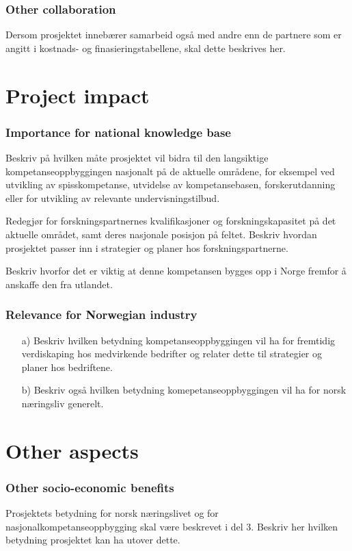 \documentclass[11pt,a4paper,norsk]{article}
\begin{document}
\section{Other collaboration}
Dersom prosjektet innebærer samarbeid også med andre enn de partnere som er angitt i kostnads- og finasieringstabellene, skal dette beskrives her.

\part{Project impact}

\section{Importance for national knowledge base}
Beskriv på hvilken måte prosjektet vil bidra til den langsiktige kompetanseoppbyggingen nasjonalt på de aktuelle områdene, for eksempel ved utvikling av spisskompetanse, utvidelse av kompetansebasen, forskerutdanning eller for utvikling av relevante undervisningstilbud.

Redegjør for forskningspartnernes kvalifikasjoner og forskningskapasitet på det aktuelle området, samt deres nasjonale posisjon på feltet. Beskriv hvordan prosjektet passer inn i strategier og planer hos forskningspartnerne.

Beskriv hvorfor det er viktig at denne kompetansen bygges opp i Norge fremfor å anskaffe den fra utlandet.

\section{Relevance for Norwegian industry}
\begin{itemize}
	\item[a)] Beskriv hvilken betydning kompetanseoppbyggingen vil ha for fremtidig verdiskaping hos medvirkende bedrifter og relater dette til strategier og planer hos bedriftene.
	\item[b)] Beskriv også hvilken betydning komepetanseoppbyggingen vil ha for norsk næringsliv generelt. 
\end{itemize}

\part{Other aspects}

\section{Other socio-economic benefits}
Prosjektets betydning for norsk næringslivet og for nasjonalkompetanseoppbygging skal være beskrevet i del 3. Beskriv her hvilken betydning prosjektet kan ha utover dette. 
\end{document}
